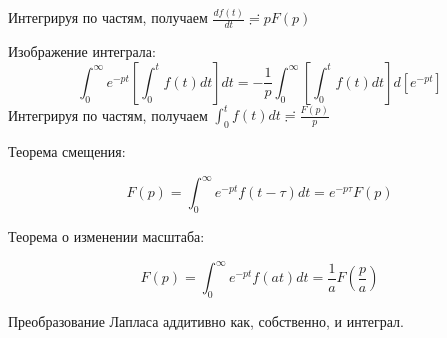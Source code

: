 Интегрируя по частям, получаем $\frac{df(t)}{dt} \risingdotseq p F(p) $

Изображение интеграла:
$$
\int_0^\infty e^{-p t} \left[ \int_0^t f(t) dt \right]  dt = - \frac{1}{p} \int_0^\infty  \left[ \int_0^t f(t) dt \right]  d[e^{-p t}]
$$
Интегрируя по частям, получаем $\int_0^t f(t) dt \risingdotseq \frac{F(p)}{p} $


Теорема смещения:

\begin{equation}
F(p) = \int_0^\infty e^{-p t} f(t - \tau) dt = e^{-p\tau} F(p)
\end{equation}

Теорема о изменении масштаба:

\begin{equation}
F(p) = \int_0^\infty e^{-p t} f(a t) dt = \frac{1}{a}F(\frac{p}{a})
\end{equation}

Преобразование Лапласа аддитивно как, собственно, и интеграл.




\pagebreak
